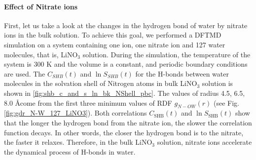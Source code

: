 \paragraph{Effect of Nitrate ions}
First, let us take a look at the changes in the hydrogen bond of water by nitrate ions in the bulk solution. 
To achieve this goal, we performed a DFTMD simulation on a system containing one \Li ion, one nitrate ion 
and 127 water molecules, that is, LiNO$_3$ solution. During the simulation, the temperature of the system is 
300 K and the volume is a constant, and periodic boundary conditions are used.
The $C_{SHB}(t)$ and $\ln{S_{SHB}(t)}$ for the H-bonds between water molecules in the solvation shell of Nitrogen atoms in bulk LiNO$_3$ solution is shown in 
\ref{fig:shb_c_and_s_ln_bk_NShell_pbc}. The values of radius 4.5, 6.5, 8.0 \AA come from the first three minimum values of RDF $g_{N-OW}(r)$ 
(see Fig.\thinspace\ref{fig:gdr_N-W_127_LiNO3}). 
Both correlations $C_{\text{SHB}}(t)$ and $\ln{S_{\text{SHB}}(t)}$ show that the longer the hydrogen bond from the nitrate ion, the slower the correlation function decays. 
In other words, the closer the hydrogen bond is to the nitrate, the faster it relaxes. Therefore, in the bulk LiNO$_3$ solution, nitrate ions accelerate the dynamical 
process of H-bonds in water.
%


